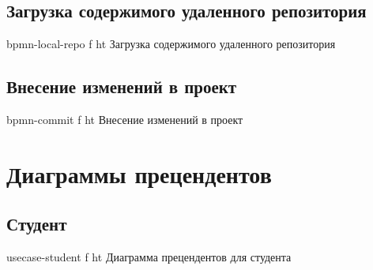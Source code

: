 \documentclass{bmstu}
\begin{document}
\subsection*{Загрузка содержимого удаленного репозитория}
{bpmn-local-repo}
{f}
{ht}
{\textwidth}
{Загрузка содержимого удаленного репозитория}
\FloatBarrier

\subsection*{Внесение изменений в проект}
{bpmn-commit}
{f}
{ht}
{\textwidth}
{Внесение изменений в проект}
\FloatBarrier

\section{Диаграммы прецендентов}

\subsection*{Студент}
{usecase-student}
{f}
{ht}
{\textwidth}
{Диаграмма прецендентов для студента}
\FloatBarrier
\end{document}
